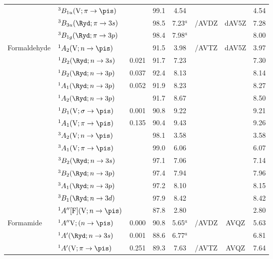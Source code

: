 \begin{tabular}{llcccccc}
        &$^3B_{1u} (\mathrm{V};\pi \rightarrow \pis)$ 				&		&99.1 &4.54		& 			&			&4.54	\\
        &$^3B_{3u} (\Ryd;\pi \rightarrow 3s)$ 					&		&98.5 &7.23$^a$	&{\exCI}/AVDZ& dAV5Z		&7.28	\\
        &$^3B_{1g} (\Ryd;\pi \rightarrow 3p)$ 					&		&98.4 &7.98$^a$	&			&			&8.00	\\
  Formaldehyde	&$^1A_2 (\mathrm{V}; n \rightarrow \pis)$ 				&		&91.5 &3.98		&{\exCI}/AVTZ & dAV5Z		&3.97	\\
        &$^1B_2 (\Ryd;n \rightarrow 3s)$ 						& 0.021	&91.7 &7.23		&			 &			&7.30	\\
        &$^1B_2 (\Ryd;n \rightarrow 3p)$ 						& 0.037	&92.4 &8.13		&			&			&8.14	\\
        &$^1A_1 (\Ryd;n \rightarrow 3p)$ 						& 0.052	&91.9 &8.23		&			&			&8.27	\\
        &$^1A_2 (\Ryd;n \rightarrow 3p)$ 						&		&91.7 &8.67		&			&			&8.50	\\
        &$^1B_1 (\mathrm{V};\sigma \rightarrow \pis)$				& 0.001	&90.8 &9.22		&			&			&9.21	\\
        &$^1A_1 (\mathrm{V};\pi \rightarrow \pis)$				& 0.135	&90.4 &9.43		&			&			&9.26	\\
        &$^3A_2 (\mathrm{V};n \rightarrow \pis)$ 					&		&98.1 &3.58		&			&			&3.58	\\
        &$^3A_1 (\mathrm{V};\pi \rightarrow \pis)$				&		&99.0 &6.06		&			&			&6.07	\\
        &$^3B_2 (\Ryd;n \rightarrow 3s)$ 						&		&97.1 &7.06		&			&			&7.14	\\
        &$^3B_2 (\Ryd;n \rightarrow 3p)$ 						&		&97.4 &7.94		&			&			&7.96	\\
        &$^3A_1 (\Ryd;n \rightarrow 3p)$ 						&		&97.2 &8.10		&			&			&8.15	\\
        &$^3B_1 (\Ryd;n \rightarrow 3d)$ 						&		&97.9 &8.42		&			&			&8.42	\\
        &$^1A'' [\mathrm{F}] (\mathrm{V};n \rightarrow \pis)$			&		&87.8 &2.80		&			&			&2.80	\\
  Formamide	&$^1A'' \mathrm{V};(n \rightarrow \pis)$					&0.000	&90.8 &5.65$^a$	&{\exCI}/AVDZ& AVQZ		&5.63	\\
        &$^1A' (\Ryd;n \rightarrow 3s)$							&0.001	&88.6 &6.77$^a$	&			&			&6.81	\\
        &$^1A' (\mathrm{V};\pi \rightarrow \pis)$					&0.251	&89.3 &7.63		&{\exCI}/AVTZ & AVQZ		&7.64	\\

\end{tabular}
